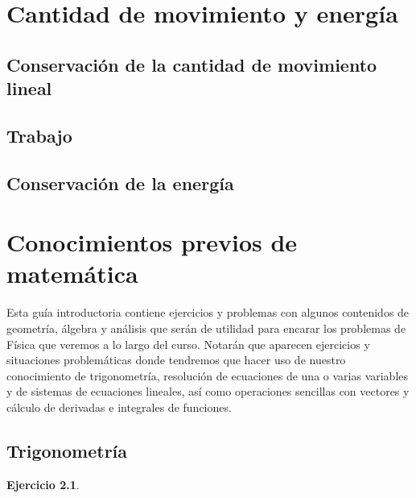 \documentclass[a4paper,12pt,twoside]{book}
\newtheorem{ejercicio}{{Ejercicio}}[chapter]
\begin{document}
\chapter{Cantidad de movimiento y energía}


\section{Conservación de la cantidad de movimiento lineal}


\section{Trabajo}


\section{Conservación de la energía}


\appendix


\chapter{Conocimientos previos de matemática}

Esta guía introductoria contiene ejercicios y problemas con algunos contenidos de geometría, álgebra y análisis que serán de utilidad para encarar los problemas de Física que veremos a lo largo del curso.
Notarán que aparecen ejercicios y situaciones problemáticas donde tendremos que hacer uso de nuestro conocimiento de trigonometría, resolución de ecuaciones de una o varias variables y de sistemas de ecuaciones lineales, así como operaciones sencillas con vectores y cálculo de derivadas e integrales de funciones.


\section{Trigonometría}

\begin{mdframed}[style=ejercicio-facil]
    \begin{ejercicio}
    \end{ejercicio}
    \begin{center}
        \def\svgwidth{0.5\linewidth}
        
    \end{center}
\end{mdframed}
\end{document}
